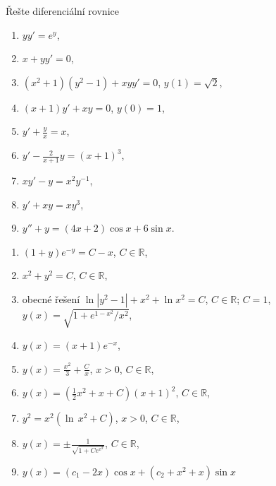 \begin{ex}
   Řešte diferenciální rovnice
   \begin{enumerate}
      \item $yy'=e^y$,
      \item $x+yy'=0$,
      \item $(x^2+1)(y^2-1)+xyy'=0$, $y(1)=\sqrt{2}$,
      \item $(x+1)y'+xy=0$, $y(0)=1$,      
      \bigskip
      \item $y'+\frac{y}{x}=x$,
      \item $y'-\frac{2}{x+1}y=(x+1)^3$,
      \bigskip
      \item $xy'-y=x^2y^{-1}$,
      \item $y'+xy=xy^3$,
      \bigskip
      \item $y''+y=(4x+2)\cos x+6\sin x$.
   \end{enumerate}
\end{ex}
\begin{sol}
   \begin{enumerate}
      \item $(1+y)e^{-y}=C-x$, $C\in\mathbb{R}$,
      \item $x^2+y^2=C$, $C\in\mathbb{R}$,
      \item obecné řešení $\ln|y^2-1|+x^2+\ln x^2=C$, $C\in\mathbb{R}$; $C=1$, $y(x)=\sqrt{1+e^{1-x^2}/x^2}$,
      \item $y(x)=(x+1)e^{-x}$,
      \item $y(x)=\frac{x^2}{3}+\frac{C}{x}$, $x>0$, $C\in\mathbb{R}$,
      \item $y(x)=(\frac{1}{2}x^2+x+C)(x+1)^2$, $C\in\mathbb{R}$,
      \item $y^2=x^2(\ln\,x^2+C)$, $x>0$, $C\in\mathbb{R}$,
      \item $y(x)=\pm\frac{1}{\sqrt{1+Ce^{x^2}}}$, $C\in\mathbb{R}$,
      \item $y(x)=(c_1-2x)\cos x + (c_2+x^2+x)\sin x$
   \end{enumerate}
\end{sol}

